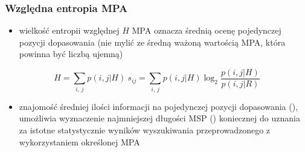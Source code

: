 \begin{frame}
\frametitle{Względna entropia MPA}

\begin{minipage}[t]{.6\textwidth}\vspace{0pt}

\begin{itemize}\scriptsize

 \item wielkość entropii względnej $H$ MPA oznacza średnią ocenę
 pojedynczej pozycji dopasowania (nie mylić ze średną ważoną
 wartością MPA, która powinna być liczbą ujemną)

\end{itemize}


 \vspace{-2ex}\[ H = \sum_{i,\,j} p(i,j|H)\:s_{ij} = \sum_{i,\,j}
 p(i,j|H) \log_2 \frac{p(i,j|H)}{p(i,j|R)} \]

\begin{itemize}\scriptsize

 \item znajomość średniej ilości informacji na pojedynczej pozycji
 dopasowania \mbox{()}, umożliwia wyznaczenie najmniejszej
 długości MSP \mbox{()} koniecznej do uznania
 za istotne statystycznie wyników wyszukiwania przeprowadzonego z
 wykorzystaniem określonej MPA

\end{itemize}

\end{minipage}\hspace{.01\textwidth}%
\begin{minipage}[t]{.38\textwidth}\vspace{0pt}

\tiny\renewcommand{\arraystretch}{1.1}\sffamily
\begin{tabular}{ r | c | r }


\end{tabular}
\end{minipage}
\end{frame}
